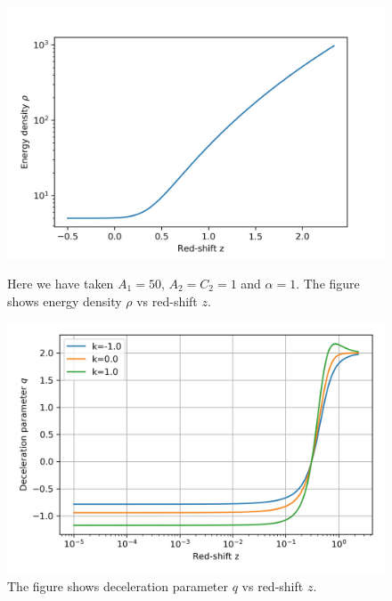 \documentclass[8pt,hideothersubsections]{beamer}
\begin{document}
\begin{frame}
\begin{figure}[ht]
    \begin{minipage}{0.49\linewidth}
        \centering
		\includegraphics[width=\textwidth]{Images/ch_rho.jpg}
		\caption{Here we have taken $A_{1}=50$, $A_{2}=C_{2}=1$ and $					\alpha=1$. The figure shows energy density $\rho$ vs red-shift $z$.}
		\label{fig:ChRho}
    \end{minipage}
    \begin{minipage}{0.49\linewidth}
        \centering
        \includegraphics[width=\textwidth]{./Images/ch_q.jpg}
		\caption{The figure shows deceleration parameter $q$ vs red-shift $z$.}
		\label{fig:Chq}
    \end{minipage}
\end{figure}
\end{frame}
\end{document}
